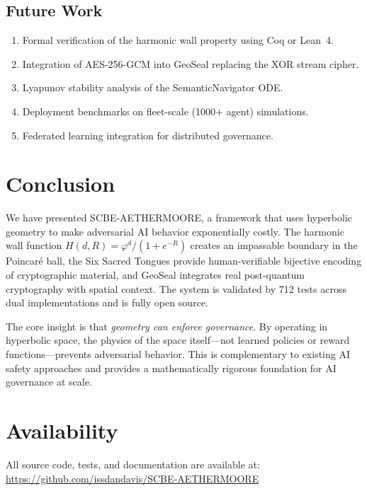\documentclass[11pt,a4paper]{article}
\newcommand{\golden}{\varphi}
\begin{document}
\subsection{Future Work}

\begin{enumerate}
  \item Formal verification of the harmonic wall property using
        Coq or Lean~4.
  \item Integration of AES-256-GCM into GeoSeal replacing the
        XOR stream cipher.
  \item Lyapunov stability analysis of the SemanticNavigator ODE.
  \item Deployment benchmarks on fleet-scale (1000+ agent) simulations.
  \item Federated learning integration for distributed governance.
\end{enumerate}

\section{Conclusion}
\label{sec:conclusion}

We have presented SCBE-AETHERMOORE, a framework that uses hyperbolic
geometry to make adversarial AI behavior exponentially costly. The
harmonic wall function $H(d, R) = \golden^d / (1 + e^{-R})$ creates
an impassable boundary in the Poincar\'{e} ball, the Six Sacred Tongues
provide human-verifiable bijective encoding of cryptographic material,
and GeoSeal integrates real post-quantum cryptography with spatial
context. The system is validated by 712 tests across dual implementations
and is fully open source.

The core insight is that \emph{geometry can enforce governance}. By
operating in hyperbolic space, the physics of the space itself---not
learned policies or reward functions---prevents adversarial behavior.
This is complementary to existing AI safety approaches and provides
a mathematically rigorous foundation for AI governance at scale.

\section*{Availability}

All source code, tests, and documentation are available at:\\
\url{https://github.com/issdandavis/SCBE-AETHERMOORE}
\end{document}
